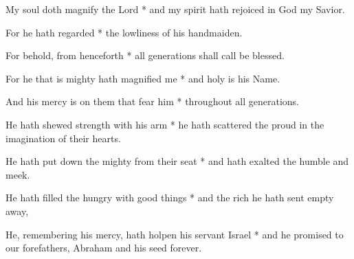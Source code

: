 \breakhere
{}
\begin{multicols}{2}
	
	My soul doth magnify the Lord * and my spirit hath rejoiced in God my Savior.
	
	For he hath regarded * the lowliness of his handmaiden.
	
	For behold, from henceforth * all generations shall call be blessed.
	
	For he that is mighty hath magnified me * and holy is his Name.
	
	And his mercy is on them that fear him * throughout all generations.
	
	He hath shewed strength with his arm * he hath scattered the proud in the imagination of their hearts.
	
	He hath put down the mighty from their seat * and hath exalted the humble and meek.
	
	He hath filled the hungry with good things * and the rich he hath sent empty away,
	
	He, remembering his mercy, hath holpen his servant Israel * and he promised to our forefathers, Abraham and his seed forever.
	
	\gloria{}
\end{multicols}